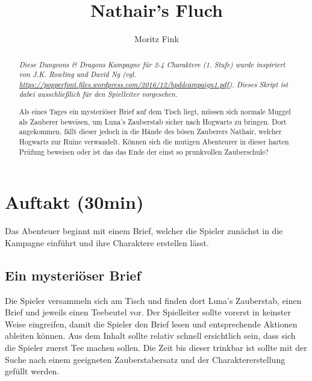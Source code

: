 \documentclass[]{scrartcl}
\title{Nathair's Fluch}
\author{Moritz Fink}
\begin{document}
\maketitle

\begin{abstract}
\textit{
Diese Dungeons \& Dragons Kampagne für 2-4 Charaktere (1. Stufe) wurde inspiriert von J.K. Rowling und David Ng (vgl. \url{https://popperfont.files.wordpress.com/2016/12/hpddcampaign1.pdf}). Dieses Skript ist dabei ausschließlich für den Spielleiter vorgesehen.\\
}

Als eines Tages ein mysteriöser Brief auf dem Tisch liegt, müssen sich normale Muggel als Zauberer beweisen, um Luna's Zauberstab sicher nach Hogwarts zu bringen. Dort angekommen, fällt dieser jedoch in die Hände des bösen Zauberers Nathair, welcher Hogwarts zur Ruine verwandelt. Können sich die mutigen Abenteurer in dieser harten Prüfung beweisen oder ist das das Ende der einst so prunkvollen Zauberschule?
\end{abstract}

\newpage

\tableofcontents

\newpage

\section{Auftakt (30min)}

Das Abenteuer beginnt mit einem Brief, welcher die Spieler zunächst in die Kampagne einführt und ihre Charaktere erstellen lässt.

\subsection{Ein mysteriöser Brief}

Die Spieler versammeln sich am Tisch und finden dort Luna's Zauberstab, einen Brief und jeweils einen Teebeutel vor. Der Spielleiter sollte vorerst in keinster Weise eingreifen, damit die Spieler den Brief lesen und entsprechende Aktionen ableiten können. Aus dem Inhalt sollte relativ schnell ersichtlich sein, dass sich die Spieler zuerst Tee machen sollen. Die Zeit bis dieser trinkbar ist sollte mit der Suche nach einem geeigneten Zauberstabersatz und der Charaktererstellung gefüllt werden.

\newpage
\end{document}
